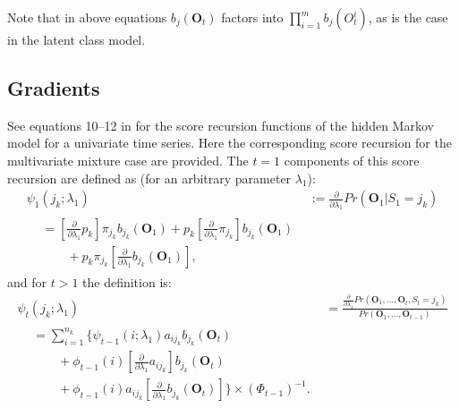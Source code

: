 \documentclass[a4paper,12pt,doc]{apaIngmar} %
\newcommand{\vc}{\mathbf}
\begin{document}
Note that in above equations $b_{j}(\vc{O}_{t})$ factors into
$\prod_{i=1}^{m} b_{j} (O_{t}^{i})$, as is the case in the latent
class model.






\subsection{Gradients}

\newcommand{\fpp}{\frac{\partial} {\partial \lambda_{1}}}

See equations 10--12 in \cite{Lystig2002} for the score recursion
functions of the hidden Markov model for a univariate time series.
Here the corresponding score recursion for the multivariate mixture
case are provided.  The $t=1$ components of this score recursion are
defined as (for an arbitrary parameter $\lambda_{1}$):
\begin{align}
\psi_{1}(j_{k};\lambda_{1}) &:=  \fpp Pr(\vc{O}_{1}|S_{1}=j_{k}) \\
\begin{split} 
	&= \left[  \fpp p_{k} \right] \pi_{j_{k}}b_{j_{k}}(\vc{O}_{1}) + 
	p_{k}\left[ \fpp \pi_{j_{k}} \right] b_{j_{k}}(\vc{O}_{1}) \\
	& \qquad  + p_{k}\pi_{j_{k}} \left[ \fpp 
b_{j_{k}}(\vc{O}_{1})\right],
\end{split} \label{eq:psi1}
\end{align}
and for $t>1$ the definition is:
\begin{align}
	\psi_{t}(j_{k};\lambda_{1}) & = \frac{\fpp Pr(\vc{O}_{1}, \ldots,
	\vc{O}_{t}, S_{t}=j_{k})} {Pr(\vc{O}_{1}, \ldots, \vc{O}_{t-1})}
	\\
	\begin{split} 
		& = \sum_{i=1}^{n_{k}} \Bigg\{
		\psi_{t-1}(i;\lambda_{1})a_{ij_{k}} b_{j_{k}}(\vc{O}_{t}) \\
			&\qquad +\phi_{t-1}(i) \left[ \fpp a_{ij_{k}} \right]
			b_{j_{k}} (\vc{O}_{t}) \\
			&\qquad +\phi_{t-1}(i)a_{ij_{k}}  \left[ \fpp b_{j_{k}} 
			(\vc{O}_{t}) \right] \Bigg\} 
			\times (\Phi_{t-1})^{-1}.
		\end{split} 
	\label{eq:psit}
\end{align}
\end{document}
